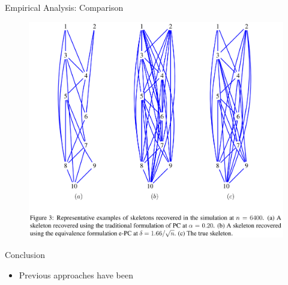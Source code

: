 \documentclass{beamer}
\begin{document}
\begin{frame}{Empirical Analysis: Comparison}
	\begin{figure}
		\centering
		\includegraphics[scale=0.12]{imgs/empirical_compare.png}
	\end{figure}
\end{frame}

\begin{frame}{Conclusion}
	\begin{itemize}
		\item Previous approaches have been 
	\end{itemize}
\end{frame}
\end{document}
